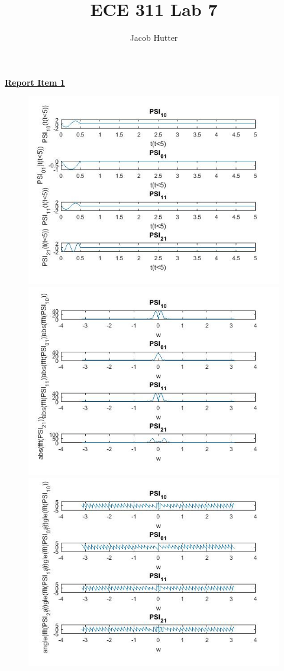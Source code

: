 \documentclass{article}
\author{Jacob Hutter}
\title{ECE 311 Lab 7}
\begin{document}
\maketitle


\color{red}
\underline{\textbf{Report Item 1}}
\color{black}

\begin{figure}[H]
\includegraphics[scale=.5]{1}
\includegraphics[scale=.5]{1_magnitude}
\includegraphics[scale=.5]{1_phase}
\end{figure}
\end{document}
